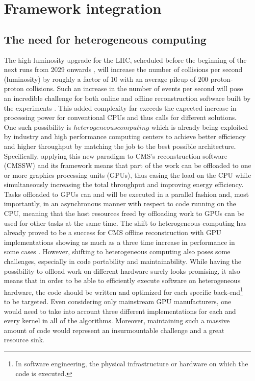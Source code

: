 \section{Framework integration}
\label{ch:framework_integration}

\subsection{The need for heterogeneous computing}
\label{ch:heterogeneous}
The high luminosity upgrade for the LHC, scheduled before the beginning of the next runs from 2029 onwards , will increase the number of collisions per second (luminosity) by roughly a factor of 10 with an average pileup of 200 proton-proton collisions. Such an increase in the number of events per second will pose an incredible challenge for both online and offline reconstruction software built by the experiments \cite{high_luminosity}. This added complexity far exceeds the expected increase in processing power for conventional CPUs and thus calls for different solutions. One such possibility is $heterogeneous computing$ which is already being exploited by industry and high performance computing centers to achieve better efficiency and higher throughput by matching the job to the best possible architecture. Specifically, applying this new paradigm to CMS's reconstruction software (CMSSW) and its framework means that part of the work can be offloaded to one or more graphics processing units (GPUs), thus easing the load on the CPU while simultaneously increasing the total throughput and improving energy efficiency. Tasks offloaded to GPUs can and will be executed in a parallel fashion and, most importantly, in an asynchronous manner with respect to code running on the CPU, meaning that the host resources freed by offloading work to GPUs can be used for other tasks at the same time. The shift to heterogeneous computing has already proved to be a success for CMS offline reconstruction with GPU implementations showing as much as a three time increase in performance in some cases \cite{high_luminosity}. However, shifting to heterogeneous computing also poses some challenges, especially in code portability and maintainability. While having the possibility to offload work on different hardware surely looks promising, it also means that in order to be able to efficiently execute software on heterogeneous hardware, the code should be written and optimized for each specific back-end\footnote{In software engineering, the physical infrastructure or hardware on which the code is executed.} to be targeted. Even considering only mainstream GPU manufacturers, one would need to take into account three different implementations for each and every kernel in all of the algorithms. Moreover, maintaining such a massive amount of code would represent an insurmountable challenge and a great resource sink. 

